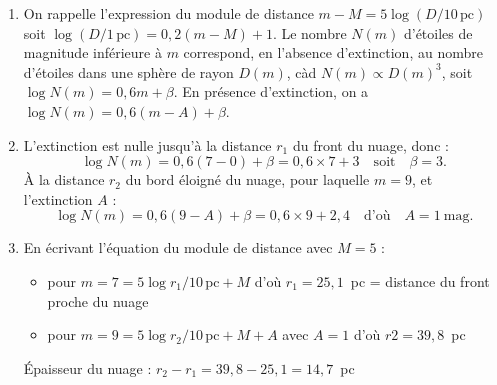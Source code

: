 \documentclass[a4paper,10pt]{report}
\renewcommand{\u}[1]{\ensuremath{\mathrm{#1}}} %
\begin{document}
\begin{Answer}
  \begin{enumerate}
  \item On rappelle l'expression du module de distance $m-M =
    5\log(D/10\,\u{pc})$ soit $\log(D/1\,\u{pc}) = 0,2(m-M)+1$. Le
    nombre $N(m)$ d'étoiles de magnitude inférieure à $m$ correspond,
    en l'absence d'extinction, au nombre d'étoiles dans une sphère de
    rayon $D(m)$, càd $N(m) \propto D(m)^3$, soit $\log N(m) = 0,6 m +
    \beta$.  En présence d'extinction, on a $\log N(m) = 0,6(m-A) +
    \beta$.
  \item L'extinction est nulle jusqu'à la distance $r_1$ du front du
    nuage, donc :
    $$
    \log{N(m)} = 0,6 (7-0) + \beta = 0,6\times 7 + 3
    \quad\text{soit}\quad \beta=3.
    $$
    À la distance $r_2$ du bord éloigné du nuage, pour laquelle $m =
    9$, et l'extinction $A$ :
    $$
    \log{N(m)} = 0,6 (9-A) + \beta = 0,6\times 9 + 2,4
    \quad\text{d'où}\quad A = 1~\u{mag}.
    $$
  \item En écrivant l'équation du module de distance avec $M=5$ :
    \begin{itemize}
    \item pour $m = 7 = 5\log{r_1/10\,\u{pc}}+M$ d'où $r_1 = 25,1$~pc
      = distance du front proche du nuage
    \item pour $m = 9 = 5\log{r_2/10\,\u{pc}}+M+A$ avec $A=1$ d'où $r2
      = 39,8$~pc
    \end{itemize}
    Épaisseur du nuage : $r_2-r_1 = 39,8-25,1 = 14,7$~pc
  \end{enumerate}
\end{Answer}
\end{document}
